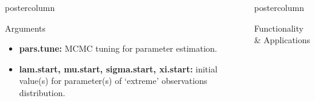 \documentclass[final]{beamer}\usepackage[]{graphicx}\usepackage[]{color}
\newlength{\columnheight}\setlength{\columnheight}{75cm} %
\begin{document}
{\begin{frame}
\begin{columns}
\begin{column}{.33\textwidth}
\begin{beamercolorbox}[center,wd=\textwidth]{postercolumn}
\begin{minipage}[T]{.97\textwidth}
{\begin{block}{Arguments}
\begin{itemize}
\begin{itemize}
		\item \textbf{pars.tune:} MCMC tuning for parameter estimation.
		\item \textbf{lam.start, mu.start, sigma.start, xi.start:} initial value(s) for parameter(s) of `extreme' observations distribution.
	\end{itemize}
\end{itemize}





\end{block}
}
\end{minipage}
\end{beamercolorbox}
\end{column}
\begin{column}{.33\textwidth}
\begin{beamercolorbox}[center,wd=\textwidth]{postercolumn}
\begin{minipage}[T]{.97\textwidth} %
\parbox[t][\columnheight]{\textwidth}{ %



\begin{block}{Functionality \& Applications}


\begin{minipage}[t][0.1mm]{.5\textwidth}
	

\end{minipage}
\end{block}}
\end{minipage}
\end{beamercolorbox}
\end{column}
\end{columns}
\end{frame}}
\end{document}
